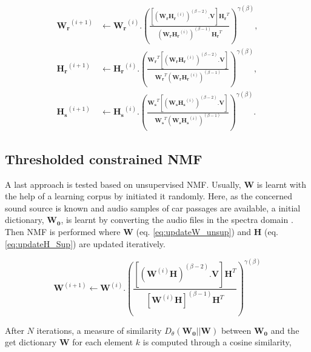 \documentclass[twocolumn,a4paper,10pt]{article}
\begin{document}
{\scriptsize
\begin{subequations}\label{eq:WH-SSupdate}
\begin{align}
\mathbf{W_r}^{(i+1)} &\leftarrow \mathbf{W_r}^{(i)}.\left(\frac{\left[\left(\mathbf{W_r H_r}^{(i)} \right)^{(\beta-2)}.\mathbf{V} \right]\mathbf{H_r}^T}{\left(\mathbf{W_r H_r}^{(i)} \right)^{(\beta-1)}\mathbf{H_r}^T}\right)^{\gamma(\beta)}, \label{eq:W_r_SS}\\
\mathbf{H_r}^{(i+1)} &\leftarrow \mathbf{H_r}^{(i)}.\left(\frac{\mathbf{W_r}^T \left[\left(\mathbf{W_r H_r}^{(i)} \right)^{(\beta-2)}.\mathbf{V} \right]}{\mathbf{W_r}^T \left(\mathbf{W_r H_r}^{(i)} \right)^{(\beta-1)}}\right)^{\gamma(\beta)}, \label{eq:H_r_SS}\\
\mathbf{H_s}^{(i+1)} &\leftarrow \mathbf{H_s}^{(i)}.\left(\frac{\mathbf{W_s}^T \left[\left(\mathbf{W_s H_s}^{(i)} \right)^{(\beta-2)}.\mathbf{V} \right]}{\mathbf{W_s}^T \left(\mathbf{W_s H_s}^{(i)} \right)^{(\beta-1)}}\right)^{\gamma(\beta)}.\label{eq:H_s_SS}
\end{align}
\end{subequations}}


\subsection{Thresholded constrained NMF}

A last approach is tested based on unsupervised NMF. Usually, $\mathbf{W}$ is learnt with the help of a learning corpus by initiated it randomly. Here, as the concerned sound source is known and audio samples of car passages are available, a initial dictionary, $\mathbf{W_0}$, is learnt by converting the audio files in the spectra domain . Then NMF is performed where $\mathbf{W}$ (eq. \ref{eq:updateW_unsup}) and $\mathbf{H}$ (eq.  \ref{eq:updateH_Sup}) are updated iteratively. 

\begin{equation}\label{eq:updateW_unsup}
\textbf{W}^{(i+1)} \leftarrow \mathbf{W}^{(i)}.\left(\frac{\left[\left(\mathbf{W}^{(i)}\mathbf{H} \right)^{(\beta-2)}.\mathbf{V} \right]\mathbf{H}^T}{\left[\mathbf{W}^{(i)}\mathbf{H} \right]^{(\beta-1)}\mathbf{H}^T}\right)^{\gamma(\beta)}
\end{equation}

After $N$ iterations, a measure of similarity $D_{\theta}\left(\mathbf{W_0} \vert \vert \mathbf{W} \right)$ between $\mathbf{W_0}$ and the get dictionary $\mathbf{W}$ for each element $k$ is computed through a cosine similarity, 
\end{document}
